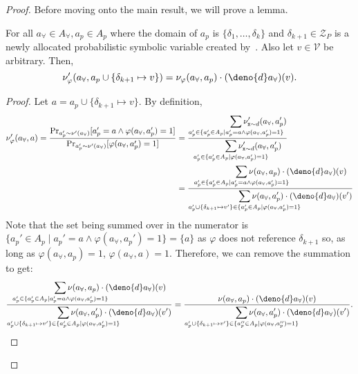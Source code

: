 \documentclass[acmsmall,review,anonymous]{acmart}\settopmatter{printfolios=true,printccs=false,printacmref=false}
\begin{document}
\begin{proof}
  Before moving onto the main result, we will prove a lemma.
  \begin{lemma}
    \label{lem:split}
    For all $a_{\forall} \in \mathit{A}_{\forall}, a_p \in \mathit{A}_p$ where the domain of $a_p$ is $\{\delta_1,\ldots,\delta_k\}$ and $\delta_{k+1} \in \mathcal{Z}_P$ is a newly allocated probabilistic symbolic variable created by~. Also let $v \in \mathcal{V}$ be arbitrary. Then,
    \[
      \nu_{\varphi}'(a_{\forall},a_p \cup \{\delta_{k+1} \mapsto v\}) = \nu_{\varphi}(a_{\forall},a_p) \cdot (\deno{d} a_{\forall})(v).
    \]
  \end{lemma}
  \begin{proof}
    Let $a = a_p \cup \{\delta_{k+1} \mapsto v\}$. By definition,
    \begin{align*}
      \nu_{\varphi}'(a_{\forall}, a) = \frac{\Pr_{a_p' \sim \nu'(a_{\forall})}[a_p' = a \wedge \varphi(a_{\forall},a_p') = 1]}{\Pr_{a_p' \sim \nu'(a_{\forall})}[\varphi(a_{\forall},a_p') = 1]}
      &= \frac{\displaystyle \smashoperator[r]{\sum_{a_p' \in \{a_p' \in \mathit{A}_p \mid a_p' = a \wedge \varphi(a_{\forall},a_p') = 1\}}} \nu'_{\mathtt{x}\sim d}(a_{\forall},a_p')}{\displaystyle \smashoperator[r]{\sum_{a_p' \in \{a_p' \in \mathit{A}_p \mid \varphi(a_{\forall},a_p') = 1\}}} \nu'_{\mathtt{x}\sim d}(a_{\forall},a_p')}\\
      &= \frac{\displaystyle \smashoperator[r]{\sum_{a_p' \in \{a_p' \in \mathit{A}_p \mid a_p' = a \wedge \varphi(a_{\forall},a_p') = 1\}}} \nu(a_{\forall},a_p)\cdot(\deno{d}a_{\forall})(v)}{\displaystyle \smashoperator[r]{\sum_{a_p' \cup \{\delta_{k+1} \mapsto v'\} \in \{a_p' \in \mathit{A}_p \mid \varphi(a_{\forall},a_p') = 1\}}} \nu(a_{\forall},a_p')\cdot(\deno{d}a_{\forall})(v')}
    \end{align*}
    Note that the set being summed over in the numerator is $\{a_p' \in \mathit{A}_p \mid a_p' = a \wedge \varphi(a_{\forall},a_p') = 1\} = \{a\}$ as $\varphi$ does not reference $\delta_{k+1}$ so, as long as $\varphi(a_{\forall},a_p)=1$, $\varphi(a_{\forall},a)=1$. Therefore, we can remove the summation to get:
    \[
      \frac{\displaystyle \smashoperator[r]{\sum_{a_p' \in \{a_p' \in \mathit{A}_p \mid a_p' = a \wedge \varphi(a_{\forall},a_p') = 1\}}} \nu(a_{\forall},a_p)\cdot(\deno{d}a_{\forall})(v)}{\displaystyle \smashoperator[r]{\sum_{a_p' \cup \{\delta_{k+1} \mapsto v'\} \in \{a_p' \in \mathit{A}_p \mid \varphi(a_{\forall},a_p') = 1\}}}\nu(a_{\forall},a_p')\cdot(\deno{d}a_{\forall})(v')} = \frac{\nu(a_{\forall},a_p)\cdot(\deno{d}a_{\forall})(v)}{\displaystyle \smashoperator[r]{\sum_{a_p' \cup \{\delta_{k+1} \mapsto v'\} \in \{a_p'' \in \mathit{A}_p \mid \varphi(a_{\forall},a_p'') = 1\}}}\nu(a_{\forall},a_p')\cdot(\deno{d}a_{\forall})(v')}.
\]
\end{proof}
\end{proof}
\end{document}
